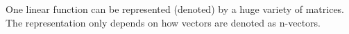 One linear function can be represented (denoted) by a huge variety of matrices. %
The representation only depends on how vectors are denoted as n-vectors.





%
%



